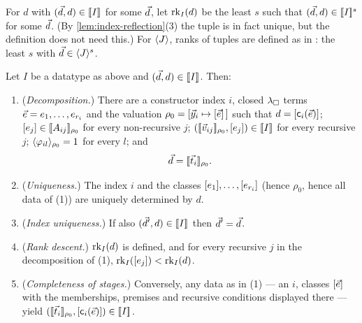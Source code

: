 \begin{definition}
\label{def:rank}
For $d$ with $(\vec{d}, d) \in [\![ I ]\!]_{}$ for some $\vec{d}$, let
$\mathrm{rk}_{I}(d)$ be the least $s$ such that $(\vec{d}, d) \in [\![ I ]\!]^{s}$
for some $\vec{d}$.  (By \cref{lem:index-reflection}(3) the tuple is in
fact unique, but the definition does not need this.)  For $\langle J \rangle$,
ranks of tuples are defined as in \cite{Extraction2026}: the least $s$
with $\vec{d} \in \langle J \rangle^s$.
\end{definition}

\begin{lemma}
\label{lem:index-reflection}
Let $I$ be a datatype as above and $(\vec{d}, d) \in [\![ I ]\!]_{}$.  Then:
\begin{enumerate}[leftmargin=2em]
\item (\emph{Decomposition.})  There are a constructor index $i$, closed
  $\lambda_{\square}$ terms $\vec{e} = e_1, \dots, e_{r_i}$ and the valuation
  $\rho_0 = [\vec{y}_i \mapsto [\vec{e}]\,]$ such that $d =
  [\mathsf{c}_i(\vec{e})]$; $[e_j] \in [\![ A_{ij} ]\!]_{\rho_0}$ for
  every non-recursive $j$; $([\![ \vec{v}_{ij} ]\!]_{\rho_0}, [e_j]) \in
  [\![ I ]\!]_{}$ for every recursive $j$; $\langle \varphi_{il} \rangle_{\rho_0} = 1$
  for every $l$; and
  \[
    \vec{d} = [\![ \vec{t}_i ]\!]_{\rho_0}.
  \]
\item (\emph{Uniqueness.})  The index $i$ and the classes
  $[e_1], \dots, [e_{r_i}]$ (hence $\rho_0$, hence all data of
  (1)) are uniquely determined by $d$.
\item (\emph{Index uniqueness.})  If also $(\vec{d}', d) \in [\![ I ]\!]_{}$
  then $\vec{d}' = \vec{d}$.
\item (\emph{Rank descent.})  $\mathrm{rk}_{I}(d)$ is defined, and for every
  recursive $j$ in the decomposition of (1),
  $\mathrm{rk}_{I}([e_j]) < \mathrm{rk}_{I}(d)$.
\item (\emph{Completeness of stages.})  Conversely, any data as in (1)
  --- an $i$, classes $[\vec{e}]$ with the memberships, premises and
  recursive conditions displayed there --- yield
  $([\![ \vec{t}_i ]\!]_{\rho_0}, [\mathsf{c}_i(\vec{e})]) \in [\![ I ]\!]_{}$.
\end{enumerate}
\end{lemma}

